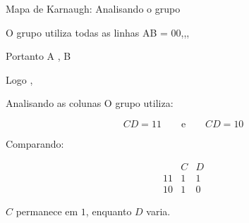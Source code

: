 \begin{frame}{Mapa de Karnaugh: Analisando o grupo}
    \small

    O grupo utiliza todas as linhas AB = 00,,,

    Portanto  A , B 

    Logo , 

    \begin{block}{Analisando as colunas}
        O grupo utiliza:

        \[
            CD=11
            \qquad\text{e}\qquad
            CD=10
        \]

        Comparando:

        \[
        \begin{array}{c|cc}
             & C & D \\ \hline
            11 & 1 & 1 \\
            10 & 1 & 0
        \end{array}
        \]

        $C$ permanece em $1$, enquanto $D$ varia.
    \end{block}

\end{frame}